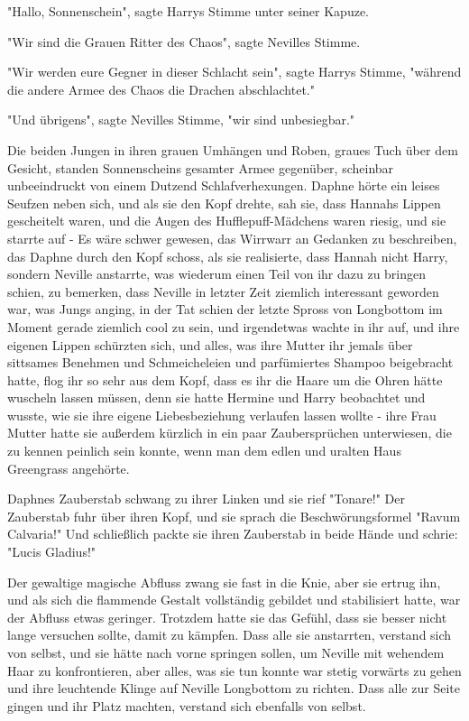 {"Hallo, Sonnenschein", sagte Harrys Stimme unter seiner Kapuze.

"Wir sind die Grauen Ritter des Chaos", sagte Nevilles Stimme.

"Wir werden eure Gegner in dieser Schlacht sein", sagte Harrys Stimme, "während die andere Armee des Chaos die Drachen abschlachtet."

"Und übrigens", sagte Nevilles Stimme, "wir sind unbesiegbar."

Die beiden Jungen in ihren grauen Umhängen und Roben, graues Tuch über dem Gesicht, standen Sonnenscheins gesamter Armee gegenüber, scheinbar unbeeindruckt von einem Dutzend Schlafverhexungen. Daphne hörte ein leises Seufzen neben sich, und als sie den Kopf drehte, sah sie, dass Hannahs Lippen gescheitelt waren, und die Augen des Hufflepuff-Mädchens waren riesig, und sie starrte auf - Es wäre schwer gewesen, das Wirrwarr an Gedanken zu beschreiben, das Daphne durch den Kopf schoss, als sie realisierte, dass Hannah nicht Harry, sondern Neville anstarrte, was wiederum einen Teil von ihr dazu zu bringen schien, zu bemerken, dass Neville in letzter Zeit ziemlich interessant geworden war, was Jungs anging, in der Tat schien der letzte Spross von Longbottom im Moment gerade ziemlich cool zu sein, und irgendetwas wachte in ihr auf, und ihre eigenen Lippen schürzten sich, und alles, was ihre Mutter ihr jemals über sittsames Benehmen und Schmeicheleien und parfümiertes Shampoo beigebracht hatte, flog ihr so sehr aus dem Kopf, dass es ihr die Haare um die Ohren hätte wuscheln lassen müssen, denn sie hatte Hermine und Harry beobachtet und wusste, wie sie ihre eigene Liebesbeziehung verlaufen lassen wollte - ihre Frau Mutter hatte sie außerdem kürzlich in ein paar Zaubersprüchen unterwiesen, die zu kennen peinlich sein konnte, wenn man dem edlen und uralten Haus Greengrass angehörte.

Daphnes Zauberstab schwang zu ihrer Linken und sie rief "Tonare!" Der Zauberstab fuhr über ihren Kopf, und sie sprach die Beschwörungsformel "Ravum Calvaria!" Und schließlich packte sie ihren Zauberstab in beide Hände und schrie: "Lucis Gladius!"

Der gewaltige magische Abfluss zwang sie fast in die Knie, aber sie ertrug ihn, und als sich die flammende Gestalt vollständig gebildet und stabilisiert hatte, war der Abfluss etwas geringer. Trotzdem hatte sie das Gefühl, dass sie besser nicht lange versuchen sollte, damit zu kämpfen. Dass alle sie anstarrten, verstand sich von selbst, und sie hätte nach vorne springen sollen, um Neville mit wehendem Haar zu konfrontieren, aber alles, was sie tun konnte war stetig vorwärts zu gehen und ihre leuchtende Klinge auf Neville Longbottom zu richten. Dass alle zur Seite gingen und ihr Platz machten, verstand sich ebenfalls von selbst.

}
